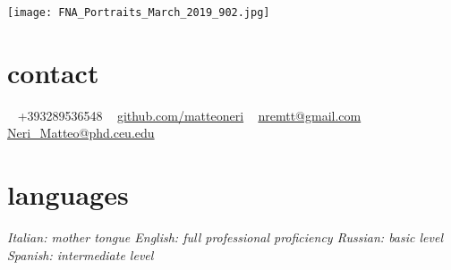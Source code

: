 \documentclass[]{cv-style}     %
\begin{document}
\lastupdated

\begin{aside}
\texttt{[image: FNA\_Portraits\_March\_2019\_902.jpg]}
%
\section{contact}

~
+393289536548
~
\href{https://github.com/matteoneri}{github.com/matteoneri}
~
\href{mailto:nremtt@gmail.com}{nremtt@gmail.com}
\href{mailto:Neri_Matteo@phd.ceu.edu}{Neri\_Matteo@phd.ceu.edu}
%
\section{languages}
\it{Italian}: mother tongue
\it{English}: full professional proficiency
\it{Russian}: basic level
\it{Spanish}: intermediate level
\end{aside}



\end{document}
